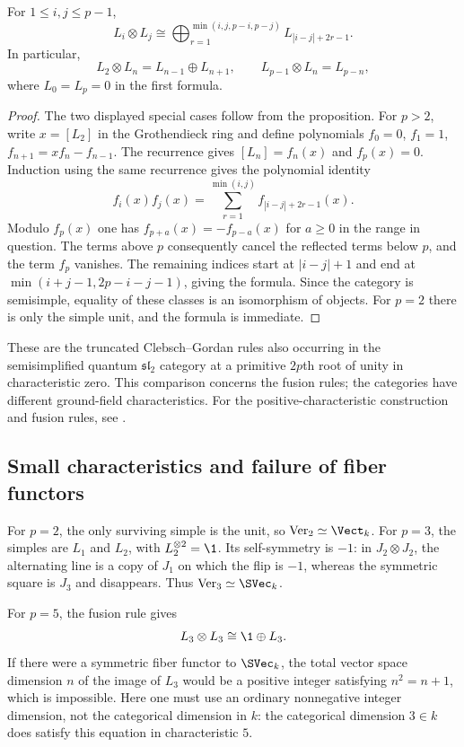 \begin{theorem}\label{thm:lec17-fusion}
For $1\leq i,j\leq p-1$,
\[
 L_i\otimes L_j\cong
 \bigoplus_{r=1}^{\min(i,j,p-i,p-j)}L_{|i-j|+2r-1}.
\]
In particular,
\[
 L_2\otimes L_n=L_{n-1}\oplus L_{n+1},\qquad
 L_{p-1}\otimes L_n=L_{p-n},
\]
where $L_0=L_p=0$ in the first formula.
\end{theorem}
\begin{proof}
The two displayed special cases follow from the proposition. For
$p>2$, write $x=[L_2]$ in the Grothendieck ring and define polynomials
$f_0=0$, $f_1=1$, $f_{n+1}=xf_n-f_{n-1}$. The recurrence gives
$[L_n]=f_n(x)$ and $f_p(x)=0$.
Induction using the same recurrence gives the polynomial identity
\[
 f_i(x)f_j(x)=\sum_{r=1}^{\min(i,j)}f_{|i-j|+2r-1}(x).
\]
Modulo $f_p(x)$ one has $f_{p+a}(x)=-f_{p-a}(x)$ for $a\geq0$ in
the range in question. The terms above $p$ consequently cancel the
reflected terms below $p$, and the term $f_p$ vanishes. The remaining
indices start at $|i-j|+1$ and end at
$\min(i+j-1,2p-i-j-1)$, giving the formula. Since the category is
semisimple, equality of these classes is an isomorphism of objects.
For $p=2$ there is only the simple unit, and the formula is immediate.
\end{proof}

These are the truncated Clebsch--Gordan rules also occurring in the
semisimplified quantum $\mathfrak{sl}_2$ category at a primitive
$2p$th root of unity in characteristic zero. This comparison concerns
the fusion rules; the categories have different ground-field
characteristics. For the positive-characteristic construction and
fusion rules, see \cite[Section 3]{OstrikVerlinde}.

\subsection{Small characteristics and failure of fiber functors}

For $p=2$, the only surviving simple is the unit, so
$\operatorname{Ver}_2\simeq\Vect_k$. For $p=3$, the simples are $L_1$
and $L_2$, with $L_2^{\otimes2}=\1$. Its self-symmetry is $-1$:
in $J_2\otimes J_2$, the alternating line is a copy of $J_1$ on which
the flip is $-1$, whereas the symmetric square is $J_3$ and disappears.
Thus $\operatorname{Ver}_3\simeq\SVec_k$.

For $p=5$, the fusion rule gives
\[
 L_3\otimes L_3\cong\1\oplus L_3.
\]
If there were a symmetric fiber functor to $\SVec_k$, the total vector
space dimension $n$ of the image of $L_3$ would be a positive integer
satisfying $n^2=n+1$, which is impossible. Here one must use an ordinary
nonnegative integer dimension, not the categorical dimension in $k$:
the categorical dimension $3\in k$ does satisfy this equation in
characteristic $5$.

